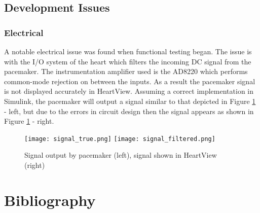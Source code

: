 \documentclass[11pt,fleqn]{book} %
\begin{document}
\section{Development Issues}

\subsection{Electrical}

A notable electrical issue was found when functional testing began. The issue is with the I/O system of the heart which filters the incoming DC signal from the pacemaker. The instrumentation amplifier used is the AD8220 which performs common-mode rejection on between the inputs. As a result the pacemaker signal is not displayed accurately in HeartView. Assuming a correct implementation in Simulink, the pacemaker will output a signal similar to that depicted in Figure \ref{fig:signal_pacemaker} - left, but due to the errors in circuit design then the signal appears as shown in Figure \ref{fig:signal_pacemaker} - right.

\begin{figure}[h]
	\centering\texttt{[image: signal\_true.png]}
	\centering\texttt{[image: signal\_filtered.png]}
	\caption{Signal output by pacemaker (left), signal shown in HeartView (right)}
	\label{fig:signal_pacemaker} %
\end{figure}

\cleardoublepage



\printbibliography
\chapter*{Bibliography}


\end{document}
